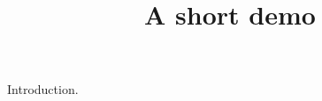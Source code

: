 \documentclass[article]{jss}
\title{A short demo}
\begin{document}
\maketitle
Introduction.
\end{document}
